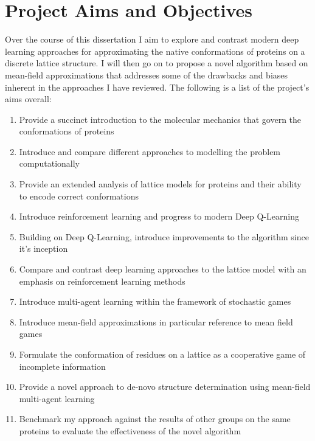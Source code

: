 \section{Project Aims and Objectives}
   Over the course of this dissertation I aim to explore and contrast
   modern deep learning approaches for approximating the native conformations
   of proteins on a discrete lattice structure. I will then go on to propose
   a novel algorithm based on mean-field approximations that addresses 
   some of the drawbacks and biases inherent in the approaches I have reviewed.
   \linebreak
   The following is a list of the project's aims overall:
   \begin{enumerate}
      \item Provide a succinct introduction to the molecular mechanics that govern the conformations of proteins
      \item Introduce and compare different approaches to modelling the problem computationally
      \item Provide an extended analysis of lattice models for proteins and their ability to encode correct conformations
      \item Introduce reinforcement learning and progress to modern Deep Q-Learning
      \item Building on Deep Q-Learning, introduce improvements to the algorithm since it's inception
      \item Compare and contrast deep learning approaches to the lattice model with an emphasis on reinforcement learning methods
      \item Introduce multi-agent learning within the framework of stochastic games
      \item Introduce mean-field approximations in particular reference to mean field games
      \item Formulate the conformation of residues on a lattice as a cooperative game of incomplete information
      \item Provide a novel approach to de-novo structure determination using mean-field multi-agent learning
      \item Benchmark my approach against the results of other groups on the same proteins to evaluate the effectiveness of the novel algorithm
   \end{enumerate}
